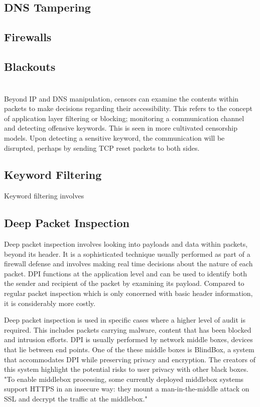  
\subsection{DNS Tampering}

\subsection{Firewalls}

\subsection{Blackouts}


\section{}
Beyond IP and DNS manipulation, censors can examine the contents within packets to make decisions regarding their accessibility. This refers to the concept of application layer filtering or blocking; monitoring a communication channel and detecting offensive keywords. This is seen in more cultivated censorship models. Upon detecting a sensitive keyword, the communication will be disrupted, perhaps by sending TCP reset packets to both sides.

\subsection{Keyword Filtering}
Keyword filtering involves 

\subsection{Deep Packet Inspection}
Deep packet inspection involves looking into payloads and data within packets, beyond its header. It is a sophisticated technique usually performed as part of a firewall defense and involves making real time decisions about the nature of each packet. DPI functions at the application level and can be used to identify both the sender and recipient of the packet by examining its payload. Compared to regular packet inspection which is only concerned with basic header information, it is considerably more costly. 

Deep packet inspection is used in specific cases where a higher level of audit is required. This includes packets carrying malware, content that has been blocked and intrusion efforts. DPI is usually performed by network middle boxes, devices that lie between end points. One of the these middle boxes is BlindBox, a system that accommodates DPI while preserving privacy and encryption. The creators of this system highlight the potential risks to user privacy with other black boxes. "To enable middlebox processing, some currently deployed middlebox systems support HTTPS in
an insecure way: they mount a man-in-the-middle attack on SSL and decrypt the traffic at the middlebox." \cite{sherry2015blindbox}

